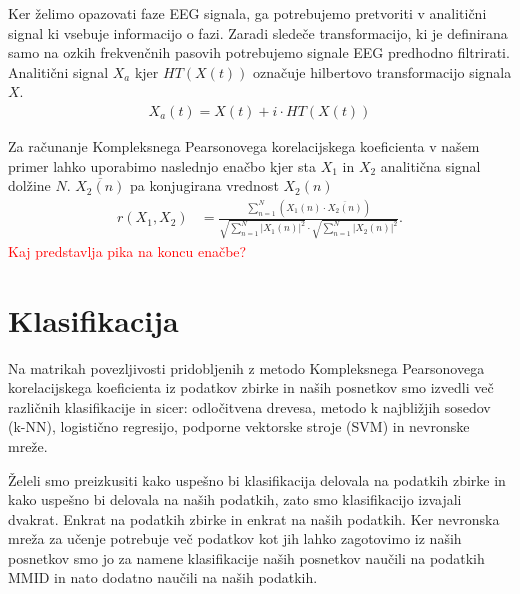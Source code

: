 Ker želimo opazovati faze EEG signala, ga potrebujemo pretvoriti v analitični signal ki vsebuje informacijo o fazi. Zaradi sledeče transformacijo, ki je definirana samo na ozkih frekvenčnih pasovih potrebujemo signale EEG predhodno filtrirati. Analitični signal $X_a$ kjer $HT(X(t))$ označuje hilbertovo transformacijo signala $X$.
\begin{align*}
    X_a(t) = X(t) + i \cdot HT(X(t))
\end{align*}

Za računanje Kompleksnega Pearsonovega korelacijskega koeficienta v našem primer lahko uporabimo naslednjo enačbo kjer sta $X_1$ in $X_2$ analitična signal dolžine $N$. $\overline{X_2(n)}$ pa konjugirana vrednost $X_2(n)$
\begin{align*}
r(X_1, X_2) &= \frac{\sum\limits_{n=1}^{N}(X_1(n) \cdot \overline{X_2(n)})}{\sqrt{\sum\limits_{n=1}^{N} |X_1(n)|^2} \cdot \sqrt{\sum\limits_{n=1}^{N} |X_2(n)|^2}}.
\end{align*}
\textcolor{red}{Kaj predstavlja pika na koncu enačbe?}




\cite{sverko_complex_2022} 

\section{Klasifikacija}
Na matrikah povezljivosti pridobljenih z metodo Kompleksnega Pearsonovega korelacijskega koeficienta iz podatkov zbirke in naših posnetkov smo izvedli več različnih klasifikacije in sicer: odločitvena drevesa, metodo k najbližjih sosedov (k-NN), logistično regresijo, podporne vektorske stroje (SVM) in nevronske mreže.

Želeli smo preizkusiti kako uspešno bi klasifikacija delovala na podatkih zbirke in kako uspešno bi delovala na naših podatkih, zato smo klasifikacijo izvajali dvakrat. Enkrat na podatkih zbirke in enkrat na naših podatkih. Ker nevronska mreža za učenje potrebuje več podatkov kot jih lahko zagotovimo iz naših posnetkov smo jo za namene klasifikacije naših posnetkov naučili na podatkih MMID in nato dodatno naučili na naših podatkih. 

